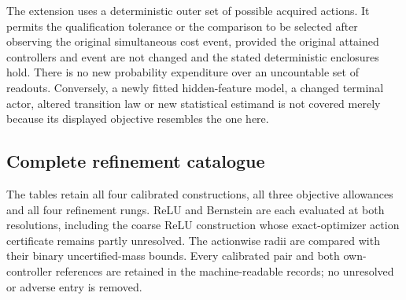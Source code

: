 The extension uses a deterministic outer set of possible acquired actions. It permits the qualification tolerance or the comparison to be selected after observing the original simultaneous cost event, provided the original attained controllers and event are not changed and the stated deterministic enclosures hold. There is no new probability expenditure over an uncountable set of readouts. Conversely, a newly fitted hidden-feature model, a changed terminal actor, altered transition law or new statistical estimand is not covered merely because its displayed objective resembles the one here.

\subsection{Complete refinement catalogue}\label{app:catalogue82}
The tables retain all four calibrated constructions, all three objective allowances and all four refinement rungs. ReLU and Bernstein are each evaluated at both resolutions, including the coarse ReLU construction whose exact-optimizer action certificate remains partly unresolved. The actionwise radii are compared with their binary uncertified-mass bounds. Every calibrated pair and both own-controller references are retained in the machine-readable records; no unresolved or adverse entry is removed.




